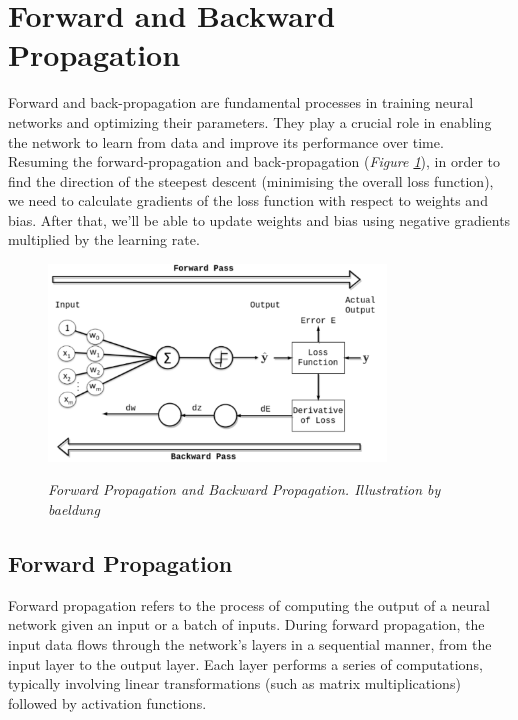 \newpage

\section{Forward and Backward Propagation}

Forward and back-propagation are fundamental processes in training neural networks and optimizing their parameters. They play a crucial role in enabling the network to learn from data and improve its performance over time. \\

Resuming the forward-propagation and back-propagation (\textit{Figure \ref{fig:forward-and-back-propagation}}), in order to find the direction of the steepest descent (minimising the overall loss function), we need to calculate gradients of the loss function with respect to weights and bias. After that, we’ll be able to update weights and bias using negative gradients multiplied by the learning rate.

\begin{figure}[H]
\centering
\includegraphics[width=0.8\textwidth]{imatges/preliminaries/front-and-back-prop.png}
    \caption[Forward Propagation and Backward Propagation]{\textit{Forward Propagation and Backward Propagation. Illustration by baeldung}}
{\label{fig:forward-and-back-propagation}}
\end{figure}


\subsection{Forward Propagation}

Forward propagation refers to the process of computing the output of a neural network given an input or a batch of inputs. During forward propagation, the input data flows through the network's layers in a sequential manner, from the input layer to the output layer. Each layer performs a series of computations, typically involving linear transformations (such as matrix multiplications) followed by activation functions. \\

